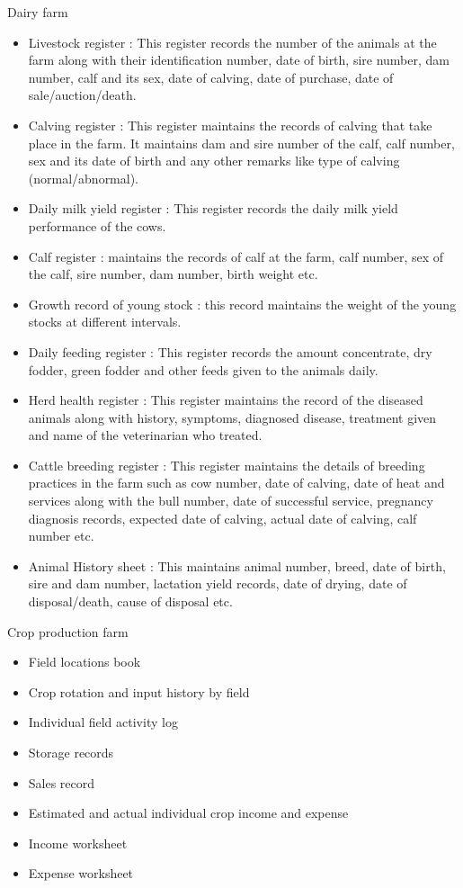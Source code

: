 \documentclass[12pt,ignorenonframetext,aspectratio=169]{beamer}
\providecommand{\tightlist}{%
  \setlength{\itemsep}{0pt}\setlength{\parskip}{0pt}}
\begin{document}
\begin{frame}{Dairy farm}
\protect\hypertarget{dairy-farm}{}
\begin{itemize}
\tightlist
\item
  Livestock register : This register records the number of the animals
  at the farm along with their identification number, date of birth,
  sire number, dam number, calf and its sex, date of calving, date of
  purchase, date of sale/auction/death.
\item
  Calving register : This register maintains the records of calving that
  take place in the farm. It maintains dam and sire number of the calf,
  calf number, sex and its date of birth and any other remarks like type
  of calving (normal/abnormal).
\item
  Daily milk yield register : This register records the daily milk yield
  performance of the cows.
\item
  Calf register : maintains the records of calf at the farm, calf
  number, sex of the calf, sire number, dam number, birth weight etc.
\item
  Growth record of young stock : this record maintains the weight of the
  young stocks at different intervals.
\item
  Daily feeding register : This register records the amount concentrate,
  dry fodder, green fodder and other feeds given to the animals daily.
\item
  Herd health register : This register maintains the record of the
  diseased animals along with history, symptoms, diagnosed disease,
  treatment given and name of the veterinarian who treated.
\item
  Cattle breeding register : This register maintains the details of
  breeding practices in the farm such as cow number, date of calving,
  date of heat and services along with the bull number, date of
  successful service, pregnancy diagnosis records, expected date of
  calving, actual date of calving, calf number etc.
\item
  Animal History sheet : This maintains animal number, breed, date of
  birth, sire and dam number, lactation yield records, date of drying,
  date of disposal/death, cause of disposal etc.
\end{itemize}
\end{frame}

\begin{frame}{Crop production farm}
\protect\hypertarget{crop-production-farm}{}
\begin{itemize}
\tightlist
\item
  Field locations book
\item
  Crop rotation and input history by field
\item
  Individual field activity log
\item
  Storage records
\item
  Sales record
\item
  Estimated and actual individual crop income and expense
\item
  Income worksheet
\item
  Expense worksheet
\end{itemize}
\end{frame}
\end{document}
